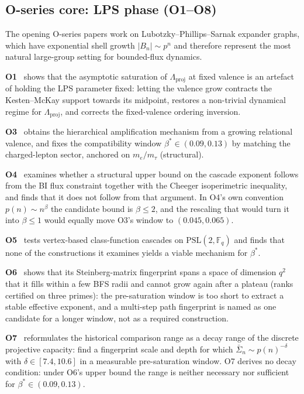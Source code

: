 \documentclass[11pt,a4paper]{article}
\theoremstyle{definition}
\newcommand{\betastar}{\beta^*}
\begin{document}
    \subsection{O-series core: LPS phase (O1--O8)}
      \label{sec:lps}

      The opening O-series papers work on Lubotzky--Phillips--Sarnak expander graphs, which have
      exponential shell growth $|B_n| \sim p^n$ and therefore represent the most natural
      large-group setting for bounded-flux dynamics.

      \textbf{O1}~\cite{Beau2026a6} shows that the asymptotic saturation of
      $\Lambda_{\mathrm{proj}}$ at fixed valence is an artefact of holding the LPS parameter
      fixed: letting the valence grow contracts the Kesten--McKay support towards its
      midpoint, restores a non-trivial dynamical regime for $\Lambda_{\mathrm{proj}}$, and
      corrects the fixed-valence ordering inversion.

      \textbf{O3}~\cite{Beau2026a7} obtains the hierarchical amplification mechanism from a
      growing relational valence, and fixes the compatibility window $\betastar \in (0.09, 0.13)$
      by matching the charged-lepton sector, anchored on $m_e/m_\tau$ (structural).

      \textbf{O4}~\cite{Beau2026a8} examines whether a structural upper bound on the cascade
      exponent follows from the BI flux constraint together with the Cheeger isoperimetric
      inequality, and finds that it does not follow from that argument.
      In O4's own convention $p(n) \sim n^\beta$ the candidate bound is $\beta \leq 2$, and the
      rescaling that would turn it into $\beta \leq 1$ would equally move O3's window to
      $(0.045, 0.065)$.

      \textbf{O5}~\cite{Beau2026a9} tests vertex-based class-function cascades on
      $\mathrm{PSL}(2,\mathbb{F}_q)$ and finds that none of the constructions it examines yields a
      viable mechanism for $\betastar$.

      \textbf{O6}~\cite{Beau2026a10} shows that its Steinberg-matrix fingerprint spans a space of
      dimension $q^2$ that it fills within a few BFS radii and cannot grow again after a plateau
      (ranks certified on three primes): the pre-saturation window is too short to extract a stable
      effective exponent, and a multi-step path fingerprint is named as one candidate for a longer
      window, not as a required construction.

      \textbf{O7}~\cite{Beau2026a11} reformulates the historical comparison range as a decay range of
      the discrete projective capacity: find a fingerprint scale and depth for which
      $\bar\Sigma_n \sim p(n)^{-\delta}$ with $\delta \in [7.4, 10.6]$ in a measurable
      pre-saturation window.
      O7 derives no decay condition: under O6's upper bound the range is neither necessary nor
      sufficient for $\betastar \in (0.09, 0.13)$.
\end{document}
